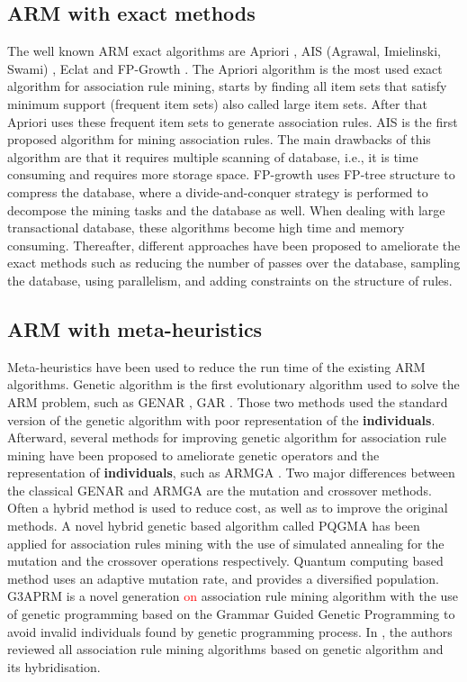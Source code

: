\documentclass[preprint,12pt]{elsarticle}
\begin{document}
\subsection{ARM with exact methods}
The well known ARM exact algorithms are Apriori \cite{5}, AIS (Agrawal, Imielinski, Swami) \cite{1}, 
Eclat \cite{9} and FP-Growth \cite{6}. 
The Apriori algorithm is the most used exact algorithm for association rule mining, starts by finding all item sets that satisfy minimum support 
(frequent item sets) also called large item sets. After that Apriori uses these frequent item sets to generate association rules. 
AIS is the first proposed algorithm for mining association rules. The main drawbacks of this algorithm are that it requires multiple scanning 
of database, i.e., it is time consuming and requires more storage space. FP-growth uses FP-tree structure to compress the database, where 
a divide-and-conquer strategy is performed to decompose the mining tasks and the database as well. When dealing with large transactional database, 
these algorithms become high time and memory consuming. Thereafter, different approaches have 
been proposed to ameliorate the exact methods such as reducing the number of passes over the database, sampling the database, using parallelism, and adding constraints on the structure of rules.

\subsection{ARM with meta-heuristics}
Meta-heuristics have been used to reduce the run time of the existing ARM algorithms. Genetic algorithm is the first evolutionary algorithm used to solve the ARM problem, such as GENAR \cite{16}, GAR \cite{17}. 
Those two methods used the standard version of the genetic algorithm with poor representation of the \textbf{individuals}. Afterward, several methods 
for improving genetic algorithm for association rule mining have been proposed to ameliorate genetic operators and the 
representation of \textbf{individuals}, such as ARMGA \cite{10}. Two major differences between the classical GENAR and ARMGA are the mutation and crossover methods. Often a hybrid method is used to reduce cost, as well as to improve the original methods. A novel hybrid genetic based algorithm called PQGMA has been applied for association rules mining with the use of simulated annealing for the mutation and the crossover operations respectively.
Quantum computing based method \cite{18} uses an adaptive mutation rate, and provides a diversified population.
G3APRM \cite{11} is a novel generation \textcolor{red}{on} association rule mining algorithm with the use of  genetic programming based on the 
Grammar Guided Genetic Programming to avoid invalid individuals found by genetic programming process. In \cite{19}, 
the authors reviewed all association rule mining algorithms based on genetic algorithm and its hybridisation.
\end{document}
